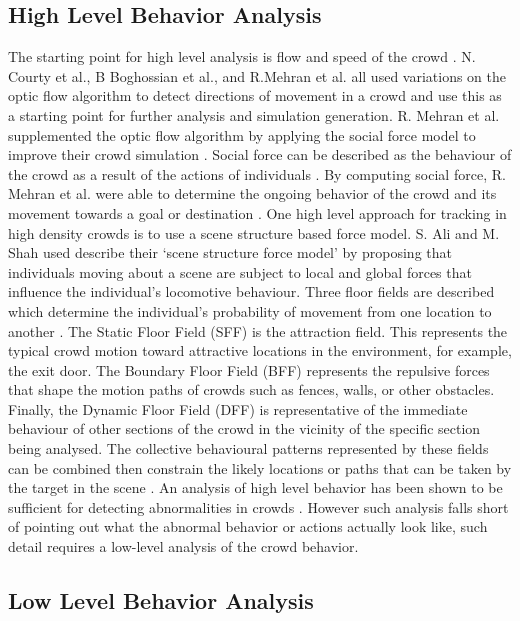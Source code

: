 \documentclass[12pt, onecolumn, conference]{IEEEtran}
\begin{document}
\subsection{High Level Behavior Analysis}

The starting point for high level analysis is flow and speed of the crowd \cite{N. Courty}\cite{B. Boghossian}\cite{R. Mehran}. N. Courty et al., B Boghossian et al., and R.Mehran et al. all used variations on the optic flow algorithm to detect directions of movement in a crowd and use this as a starting point for further analysis and simulation generation. R. Mehran et al. supplemented the optic flow algorithm by applying the social force model to improve their crowd simulation \cite{R. Mehran}. Social force can be described as the behaviour of the crowd as a result of the actions of individuals \cite{R. Mehran}. By computing social force, R. Mehran et al. were able to determine the ongoing behavior of the crowd and its movement towards a goal or destination \cite{R. Mehran}. 
One high level approach for tracking in high density crowds is to use a scene structure based force model\cite{S. Ali}. S. Ali and M. Shah used describe their ‘scene structure force model’ by proposing that individuals moving about a scene are subject to local and global forces that influence the individual’s locomotive behaviour. Three floor fields are described which determine the individual’s probability of movement from one location to another \cite{S. Ali}. The Static Floor Field (SFF) is the attraction field. This represents the typical crowd motion toward attractive locations in the environment, for example, the exit door. The Boundary Floor Field (BFF) represents the repulsive forces that shape the motion paths of crowds such as fences, walls, or other obstacles. Finally, the Dynamic Floor Field (DFF) is representative of the immediate behaviour of other sections of the crowd in the vicinity of the specific section being analysed. The collective behavioural patterns represented by these fields can be combined then constrain the likely locations or paths that can be taken by the target in the scene \cite{S. Ali}. 
An analysis of high level behavior has been shown to be sufficient for detecting abnormalities in crowds \cite{R. Mehran}\cite{F. Zhao}. However such analysis falls short of pointing out what the abnormal behavior or actions actually look like, such detail requires a low-level analysis of the crowd behavior.

\subsection{Low Level Behavior Analysis}
\end{document}
